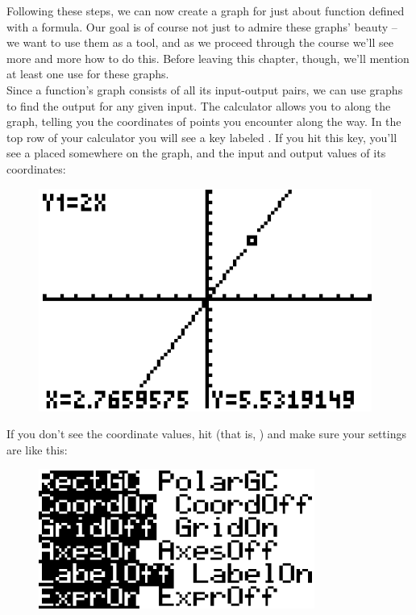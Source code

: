 Following these steps, we can now create a graph for just about function defined with a formula.  Our goal is of course not just to admire these graphs’ beauty – we want to use them as a tool, and as we proceed through the course we’ll see more and more how to do this. Before leaving this chapter, though, we’ll mention at least one use for these graphs.\\

Since a function’s graph consists of all its input-output pairs, we can use graphs to find the output for any given input. The calculator allows you to  along the graph, telling you the coordinates of points you encounter along the way. In the top row of your calculator you will see a key labeled . If you hit this key, you’ll see a  placed somewhere on the graph, and the input and output values of its coordinates:

\begin{figure}[H]
	\centering
	\includegraphics[scale=1.0]{Sections/FunctionsandGraphsImages/Figure24.png}
\end{figure}

If you don’t see the coordinate values, hit   (that is, ) and make sure your settings are like this:

\begin{figure}[H]
	\centering
	\includegraphics[scale=1.0]{Sections/FunctionsandGraphsImages/Figure25.png}
\end{figure}

